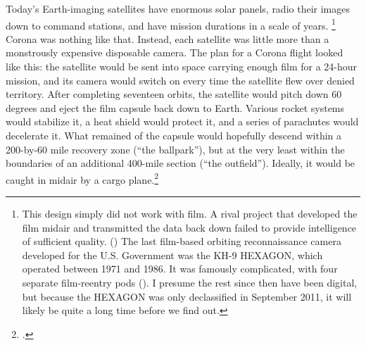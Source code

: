 \documentclass{memoir}
\begin{document}
Today's Earth-imaging satellites have enormous solar panels, radio their images down to command stations, and have mission durations in a scale of years. \footnote{This design simply did not work with film. A rival project that developed the film midair and transmitted the data back down failed to provide intelligence of sufficient quality. (\cite[p.~203-204]{brugioni_eyes_2010}) The last film-based orbiting reconnaissance camera developed for the U.S. Government was the KH-9 HEXAGON, which operated between 1971 and 1986. It was famously complicated, with four separate film-reentry pods (\cite{pressel_spy_2013}). I presume the rest since then have been digital, but because the HEXAGON was only declassified in September 2011, it will likely be quite a long time before we find out.} Corona was nothing like that. Instead, each satellite was little more than a monstrously expensive disposable camera. The plan for a Corona flight looked like this: the satellite would be sent into space carrying enough film for a 24-hour mission, and its camera would switch on every time the satellite flew over denied territory. After completing seventeen orbits, the satellite would pitch down 60 degrees and eject the film capsule back down to Earth. Various rocket systems would stabilize it, a heat shield would protect it, and a series of parachutes would decelerate it. What remained of the capsule would hopefully descend within a 200-by-60 mile recovery zone (``the ballpark''), but at the very least within the boundaries of an additional 400-mile section (``the outfield''). Ideally, it would be caught in midair by a cargo plane.\footcite[p.~56]{peebles_corona_1997}
\end{document}
